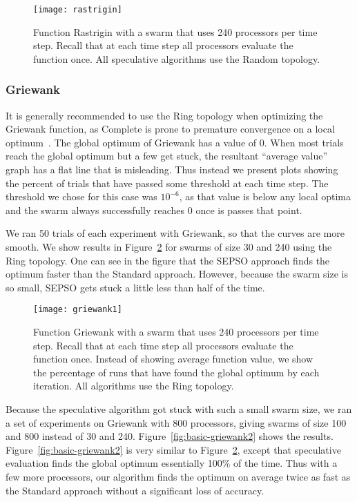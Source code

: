 \documentclass[smallcondensed]{svjour3}
\newcommand{\fig}[1]{Figure~\ref{fig:#1}}
\begin{document}
\begin{figure}
  \centering
  \texttt{[image: rastrigin]}
  \caption{Function Rastrigin with a swarm that uses 240 processors per time
  step.  Recall that at each time step all processors evaluate the function
  once.  All speculative algorithms use the Random topology.}
  \label{fig:rastrigin}
\end{figure}

\subsubsection{Griewank}
\label{sec:griewank-20}

It is generally recommended to use the Ring topology when optimizing the
Griewank function, as Complete is prone to premature convergence on a local
optimum~\citep{bratton-2007-defining-a-standard-for-pso}.  The global optimum
of Griewank has a value of 0.  When most trials reach the global optimum but a
few get stuck, the resultant ``average value'' graph has a flat line that is
misleading.  Thus instead we present plots showing the percent of trials that
have passed some threshold at each time step.  The threshold we chose for this
case was $10^{-6}$, as that value is below any local optima and the swarm
always successfully reaches 0 once is passes that point.

We ran 50 trials of each experiment with Griewank, so that the curves are more
smooth.  We show results in \fig{basic-griewank1} for swarms of size 30 and 240
using the Ring topology.  One can see in the figure that the SEPSO approach
finds the optimum faster than the Standard approach.  However, because the
swarm size is so small, SEPSO gets stuck a little less than half of the time.

\begin{figure}
  \centering
  \texttt{[image: griewank1]}
  \caption{Function Griewank with a swarm that uses 240 processors per time
  step.  Recall that at each time step all processors evaluate the function
  once.  Instead of showing average function value, we show the percentage of
  runs that have found the global optimum by each iteration.  All algorithms
  use the Ring topology.}
  \label{fig:basic-griewank1}
\end{figure}

Because the speculative algorithm got stuck with such a small swarm size, we
ran a set of experiments on Griewank with 800 processors, giving swarms of size
100 and 800 instead of 30 and 240.  \fig{basic-griewank2} shows the results.
\fig{basic-griewank2} is very similar to \fig{basic-griewank1}, except that
speculative evaluation finds the global optimum essentially 100\% of the time.
Thus with a few more processors, our algorithm finds the optimum on average
twice as fast as the Standard approach without a significant loss of accuracy.
\end{document}
